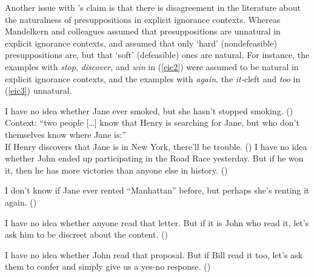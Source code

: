 \documentclass[11pt,fleqn]{article}
\def\verymarginal{{\leavevmode\llap{??}}}
\def\infelic{{\leavevmode\llap{\#}}}
\newcommand{\6}{\mbox{$[\hspace*{-.6mm}[$}}
\newcommand{\9}{\mbox{$]\hspace*{-.6mm}]$}}
\newcommand{\citepos}[1]{\citeauthor{#1}'s \citeyear{#1}}
\begin{document}
%

Another issue with \citepos{mandelkern-etal2020} claim is that there is disagreement in the literature about the naturalness of presuppositions in explicit ignorance contexts. Whereas Mandelkern and colleagues assumed that presuppositions are unnatural in explicit ignorance contexts, \citealt{simons01} and \citealt{abusch10} assumed that only `hard' (nondefeasible) presuppositions are, but that `soft' (defeasible) ones are natural. For instance,  the examples with {\em stop}, {\em discover}, and {\em win} in (\ref{eic2}) were assumed to be natural in explicit ignorance contexts, and the examples with {\em again}, the {\em it-}cleft and {\em too} in (\ref{eic3}) unnatural.%

\begin{exe}
\ex\label{eic2}
\begin{xlist}
\ex I have no idea whether Jane ever smoked, but she hasn't stopped smoking. \hfill (\citealt[443]{simons01})
\ex Context: ``two people [\ldots] know that Henry is searching for Jane, but who don't themselves know where Jane is:'' \\ If Henry discovers that Jane is in New York, there'll be trouble. \hfill (\citealt[434]{simons01})
\ex I have no idea whether John ended up participating in the
Road Race yesterday. But if he won it, then he has more victories than anyone else in history. \hfill (\citealt[39]{abusch10})
\end{xlist}
\ex\label{eic3}
\begin{xlist}
\ex\infelic I don't know if Jane ever rented ``Manhattan'' before, but perhaps she's renting it again. \hfill (\citealt[443]{simons01})

\ex \verymarginal I have no idea whether anyone read that letter. But if it is John
who read it, let's ask him to be discreet about the content. \hfill (\citealt[40]{abusch10})

\ex \verymarginal I have no idea whether John read that proposal. But if Bill read it too, let's ask them to confer and simply give us a yes-no response. \hfill (\citealt[40]{abusch10})
\end{xlist}
\end{exe}
\end{document}
